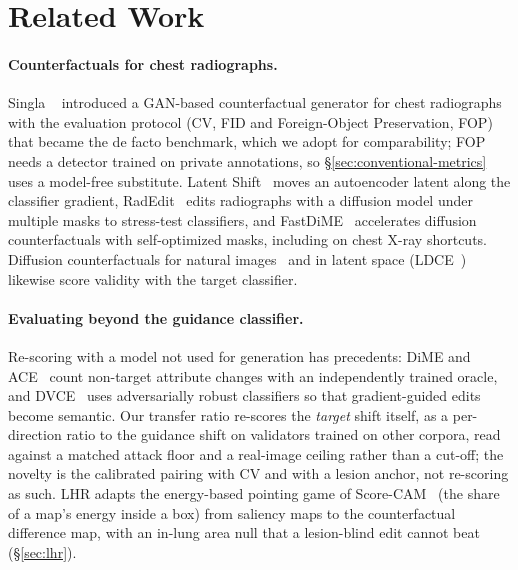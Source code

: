 \section{Related Work}
\label{sec:related}

\paragraph{Counterfactuals for chest radiographs.} Singla \etal~\cite{singla2022explaining} introduced a GAN-based counterfactual generator for chest radiographs with the evaluation protocol (CV, FID and Foreign-Object Preservation, FOP) that became the de facto benchmark, which we adopt for comparability; FOP needs a detector trained on private annotations, so \S\ref{sec:conventional-metrics} uses a model-free substitute. Latent Shift~\cite{cohen2021gifsplanation} moves an autoencoder latent along the classifier gradient, RadEdit~\cite{perezgarcia2024radedit} edits radiographs with a diffusion model under multiple masks to stress-test classifiers, and FastDiME~\cite{weng2024fastdime} accelerates diffusion counterfactuals with self-optimized masks, including on chest X-ray shortcuts. Diffusion counterfactuals for natural images~\cite{augustin2022diffusion,jeanneret2022diffusion,jeanneret2023adversarial} and in latent space (LDCE~\cite{farid2023ldce}) likewise score validity with the target classifier.

\paragraph{Evaluating beyond the guidance classifier.} Re-scoring with a model not used for generation has precedents: DiME and ACE~\cite{jeanneret2022diffusion,jeanneret2023adversarial} count non-target attribute changes with an independently trained oracle, and DVCE~\cite{augustin2022diffusion} uses adversarially robust classifiers so that gradient-guided edits become semantic. Our transfer ratio re-scores the \emph{target} shift itself, as a per-direction ratio to the guidance shift on validators trained on other corpora, read against a matched attack floor and a real-image ceiling rather than a cut-off; the novelty is the calibrated pairing with CV and with a lesion anchor, not re-scoring as such. LHR adapts the energy-based pointing game of Score-CAM~\cite{wang2020scorecam} (the share of a map's energy inside a box) from saliency maps to the counterfactual difference map, with an in-lung area null that a lesion-blind edit cannot beat (\S\ref{sec:lhr}).


